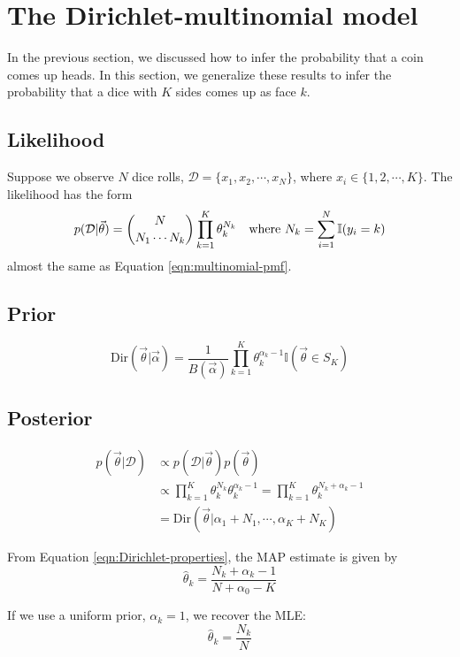 \section{The Dirichlet-multinomial model}
In the previous section, we discussed how to infer the probability that a coin comes up heads. In this section, we generalize these results to infer the probability that a dice with $K$ sides comes up as face $k$. 


\subsection{Likelihood}
Suppose we observe $N$ dice rolls, $\mathcal{D}=\{x_1,x_2,\cdots,x_N\}$, where $x_i \in \{1,2,\cdots,K\}$. The likelihood has the form
\begin{equation}
p(\mathcal{D}|\vec{\theta}) = \dbinom{N}{N_1 \cdots N_k} \prod\limits_{k=1}^K\theta_k^{N_k} \quad \text{where } N_k=\sum\limits_{i=1}^N \mathbb{I}(y_i=k)
\end{equation}
almost the same as Equation \ref{eqn:multinomial-pmf}.


\subsection{Prior}
\begin{equation}
\text{Dir}(\vec{\theta}|\vec{\alpha}) = \dfrac{1}{B(\vec{\alpha})}\prod\limits_{k=1}^K \theta_k^{\alpha_k-1}\mathbb{I}(\vec{\theta} \in S_K)
\end{equation}


\subsection{Posterior}
\begin{align}
p(\vec{\theta}|\mathcal{D})& \propto p(\mathcal{D}|\vec{\theta})p(\vec{\theta}) \\
     & \propto \prod\limits_{k=1}^K\theta_k^{N_k}\theta_k^{\alpha_k-1} = \prod\limits_{k=1}^K\theta_k^{N_k+\alpha_k-1}\\
	 & =\text{Dir}(\vec{\theta}|\alpha_1+N_1,\cdots,\alpha_K+N_K)
\end{align}

From Equation \ref{eqn:Dirichlet-properties}, the MAP estimate is given by
\begin{equation}\label{eqn:Dir-MAP}
\hat{\theta}_k=\dfrac{N_k+\alpha_k-1}{N+\alpha_0-K}
\end{equation}

If we use a uniform prior, $\alpha_k=1$, we recover the MLE:
\begin{equation}\label{eqn:Dirichlet-multinomial-posterior-MLE}
\hat{\theta}_k=\dfrac{N_k}{N}
\end{equation}


